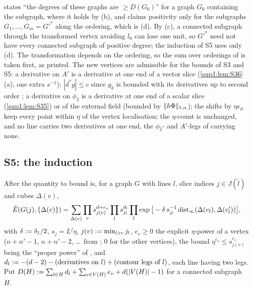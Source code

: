 \begin{remark}\label{sup1:rem:S4scope}
\cite[p.~425]{Ba3} states ``the degrees of these graphs are $\ge D(G_0)$'' for a graph $G_0$ containing the \cite[(2.4)]{Ba3} subgraph, where it holds by (b), and claims positivity only for the subgraphs $G_1,\dots,G_m=G'^*$ along the ordering, which is (d). By (c), a connected subgraph through the transformed vertex avoiding $l_0$ can lose one unit, so $G'^*$ need not have every connected subgraph of positive degree; the induction of S5 uses only (d). The transformation depends on the ordering, so the sum over orderings of \cite[(2.7)]{Ba3} is taken first, as printed. The new vertices are admissible for the bounds of S3 and S5: a derivative on $A'$ is a derivative at one end of a vector slice (\cref{sup1:lem:S36}(a), one extra $s^{-1}$); $|d^*g|\le c$ since $g_k$ is bounded with its derivatives up to second order \cite[p.~412]{Ba3}; a derivative on $\phi_2$ is a derivative at one end of a scalar slice (\cref{sup1:lem:S35}) or of the external field (bounded by $\lVert h\Phi\rVert_{1,\alpha}$); the shifts by $\eta e_\mu$ keep every point within $\eta$ of the vertex localisation; the $\eta$-count is unchanged, and no line carries two derivatives at one end, the $\phi_2$- and $A'$-legs of \cite[(1.8)]{Ba3} carrying none.
\end{remark}

\subsection{S5: the induction \cite[(2.16)]{Ba3}}\label{sup1:ssec:S5}

After \cite[(2.13)--(2.14)]{Ba3} the quantity to bound is, for a graph $G$ with lines $l$, slice indices $j\in J(\tilde l)$ and cubes $\Delta(v)$,
\begin{equation}\label{sup1:eq:214}
\tilde E(G(j),\{\Delta(v)\})=\sum_{\Delta(v)}\prod_vs_{j(v)}^{d+e_v}\prod_ls_{j_l}^{d_l}\prod_l\exp\big[-\delta\,s_{j_l}^{-1}\operatorname{dist}_\infty(\Delta(v_l),\Delta(v'_l))\big],
\end{equation}
with $\delta:=\delta_1/2$, $s_j=L^j\eta$, $j(v):=\min_{l\ni v}j_l$, $e_v\ge0$ the explicit $\eta$-power of a vertex \cite[(1.8)--(1.11)]{Ba3} ($n+n'-1$, $n+n'-2$, \dots\ from \cite[p.~413]{Ba3}; $0$ for the other vertices), the bound $\eta^{e_v}\le s_{j(v)}^{e_v}$ being the ``proper power'' of \cite[(2.14)]{Ba3}, and $d_l:=-(d-2)-(\text{derivatives on }l)+(\text{contour legs of }l)$, each line having two legs. Put $D(H):=\sum_{l\in H}d_l+\sum_{v\in V(H)}e_v+d(|V(H)|-1)$ for a connected subgraph $H$.

